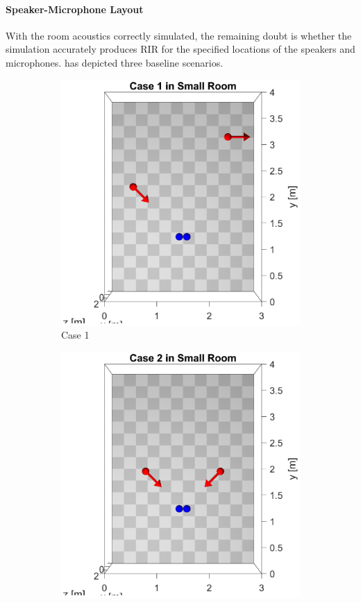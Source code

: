 \documentclass[a4paper,twoside,12pt,hidelinks]{article}
\begin{document}
\paragraph{Speaker-Microphone Layout}
With the room acoustics correctly simulated, the remaining doubt is whether the simulation accurately produces RIR for the specified locations of the speakers and microphones.  has depicted three baseline scenarios.
\begin{figure}[H]
\centering
\begin{subfigure}[H]{0.32\textwidth}
\includegraphics[width=\textwidth]{1s_lo}
\caption{Case 1}
\end{subfigure}
\begin{subfigure}[H]{0.32\textwidth}
\includegraphics[width=\textwidth]{2s_lo}

\end{subfigure}
\end{figure}
\end{document}
